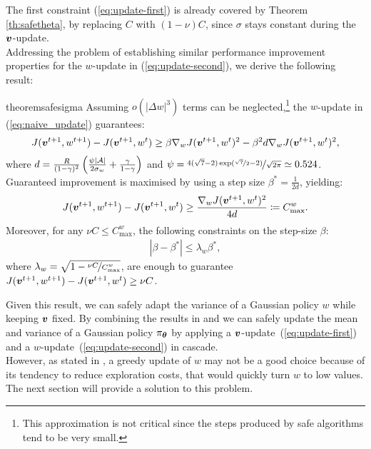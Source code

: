 The first constraint (\ref{eq:update-first}) is already covered by Theorem \ref{th:safetheta}, by replacing $C$ with $(1-\nu)C$, since $\sigma$ stays constant during the $\vv$-update. \\
Addressing the problem of establishing similar performance improvement properties for the $w$-update in (\ref{eq:update-second}), we derive the following result:
\begin{restatable}[]{theorem}{safesigma}\label{th:safesigma}
	Assuming $o(|\Delta w|^3)$ terms can be neglected,\footnote{This approximation is not critical since the steps produced by safe algorithms tend to be very small.} the $w$-update in (\ref{eq:naive_update}) guarantees:
	\begin{align}\label{stat:2_1}
	J(\vv^{t+1}, w^{t+1}) - J(\vv^{t+1}, w^t) \geq \beta\gradJ[w]{\vv^{t+1}, w^t}^2 - \beta^2 d\gradJ[w]{\vv^{t+1}, w^t}^2,
	\end{align}
	where $d=\frac{R}{(1-\gamma)^2}\left(\frac{\psi|\Aspace|}{2\sigma_{w}}+\frac{\gamma}{1-\gamma}\right)$ and $\psi = \nicefrac{4(\sqrt{7} - 2)\exp(\nicefrac{\sqrt{7}}{2} - 2)}{\sqrt{2\pi}} \simeq 0.524$. Guaranteed improvement is maximised by using a step size $\beta^*=\frac{1}{2d}$, yielding:
	\begin{align}\label{stat:2_2}
	J(\vv^{t+1},w^{t+1}) - J(\vv^{t+1}, w^t) \geq \frac{\gradJ[w]{\vv^{t+1}, w^t}^2}{4d}
	\coloneqq C_{\text{max}}^w. 
	\end{align}
	Moreover, for any $\nu C\leq C_{\text{max}}^{w}$, the following constraints on the step-size $\beta$:
	\begin{align}\label{stat:2_3}
	|\beta - \beta^*| \leq \lambda_{w}\beta^*, 
	\end{align}
	where $\lambda_{w}=\sqrt{1 - \nicefrac{\nu C}{C_{\text{max}}^{w}}}$, are enough to guarantee $J(\vv^{t+1},w^{t+1}) - J(\vv^{t+1},w^t)\geq \nu C$.
\end{restatable}

Given this result, we can safely adapt the variance of a Gaussian policy $w$ while keeping $\vv$ fixed. By combining the results in  and  we can safely update the mean and variance of a Gaussian policy $\pi_{\vtheta}$ by applying a $\vv$-update~(\ref{eq:update-first}) and a $w$-update~(\ref{eq:update-second}) in cascade.\\
However, as stated in , a greedy update of $w$ may not be a good choice because of its tendency to reduce exploration costs, that would quickly turn $w$ to low values. The next section will provide a solution to this problem.

